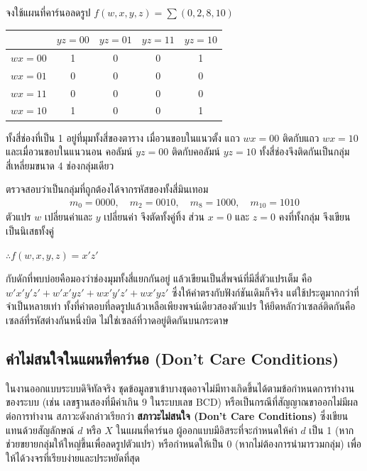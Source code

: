 \begin{ex}
\label{ex:kmap-corner-wrap}
จงใช้แผนที่คาร์นอลดรูป $f(w, x, y, z) = \sum(0, 2, 8, 10)$

\begin{center}
\begin{tabular}{|c|c|c|c|c|}
\hline
 & $yz = 00$ & $yz = 01$ & $yz = 11$ & $yz = 10$ \\
\hline
$wx = 00$ & 1 & 0 & 0 & 1 \\
\hline
$wx = 01$ & 0 & 0 & 0 & 0 \\
\hline
$wx = 11$ & 0 & 0 & 0 & 0 \\
\hline
$wx = 10$ & 1 & 0 & 0 & 1 \\
\hline
\end{tabular}
\end{center}
\end{ex}
\begin{solution}
ทั้งสี่ช่องที่เป็น 1 อยู่ที่มุมทั้งสี่ของตาราง เมื่อวนขอบในแนวตั้ง แถว $wx = 00$ ติดกับแถว $wx = 10$ และเมื่อวนขอบในแนวนอน คอลัมน์ $yz = 00$ ติดกับคอลัมน์ $yz = 10$ ทั้งสี่ช่องจึงติดกันเป็นกลุ่มสี่เหลี่ยมขนาด 4 ช่องกลุ่มเดียว

ตรวจสอบว่าเป็นกลุ่มที่ถูกต้องได้จากรหัสของทั้งสี่มินเทอม
\begin{align*}
m_0 = 0000, \quad m_2 = 0010, \quad m_8 = 1000, \quad m_{10} = 1010
\end{align*}
ตัวแปร $w$ เปลี่ยนค่าและ $y$ เปลี่ยนค่า จึงตัดทั้งคู่ทิ้ง ส่วน $x = 0$ และ $z = 0$ คงที่ทั้งกลุ่ม จึงเขียนเป็นนิเสธทั้งคู่

$\therefore f(w, x, y, z) = x'z'$ \solhere
\end{solution}

\begin{warning}
กับดักที่พบบ่อยคือมองว่าช่องมุมทั้งสี่แยกกันอยู่ แล้วเขียนเป็นสี่พจน์ที่มีสี่ตัวแปรเต็ม คือ $w'x'y'z' + w'x'yz' + wx'y'z' + wx'yz'$ ซึ่งให้ค่าตรงกับฟังก์ชันเดิมก็จริง แต่ใช้ประตูมากกว่าที่จำเป็นหลายเท่า ทั้งที่คำตอบที่ลดรูปแล้วเหลือเพียงพจน์เดียวสองตัวแปร ให้ยึดหลักว่าเซลล์ติดกันคือเซลล์ที่รหัสต่างกันหนึ่งบิต ไม่ใช่เซลล์ที่วาดอยู่ติดกันบนกระดาษ
\end{warning}

\subsection{ค่าไม่สนใจในแผนที่คาร์นอ (Don't Care Conditions)}
\label{sec:dont-care}
ในงานออกแบบระบบดิจิทัลจริง ชุดข้อมูลขาเข้าบางชุดอาจไม่มีทางเกิดขึ้นได้ตามข้อกำหนดการทำงานของระบบ (เช่น เลขฐานสองที่มีค่าเกิน 9 ในระบบเลข BCD) หรือเป็นกรณีที่สัญญาณขาออกไม่มีผลต่อการทำงาน สภาวะดังกล่าวเรียกว่า \textbf{สภาวะไม่สนใจ (Don't Care Conditions)} ซึ่งเขียนแทนด้วยสัญลักษณ์ $d$ หรือ $X$ ในแผนที่คาร์นอ ผู้ออกแบบมีอิสระที่จะกำหนดให้ค่า $d$ เป็น 1 (หากช่วยขยายกลุ่มให้ใหญ่ขึ้นเพื่อลดรูปตัวแปร) หรือกำหนดให้เป็น 0 (หากไม่ต้องการนำมารวมกลุ่ม) เพื่อให้ได้วงจรที่เรียบง่ายและประหยัดที่สุด~\parencite{mano2018digital}

